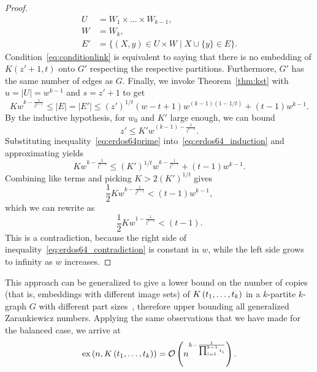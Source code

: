 \begin{theorem}
\begin{proof}
\begin{align*}
            U &= W_1 \times \dots \times W_{k-1}, \\
            W &= W_k, \\
            E' &= \{(X, y) \in U \times W \mid X \cup \{y\} \in E\}.
        \end{align*}
        Condition~\eqref{eq:conditionlink} is equivalent to saying that
        there is no embedding of $K(z' + 1, t)$ onto $G'$ respecting the respective partitions.
        Furthermore, $G'$ has the same number of edges as $G$.
        Finally, we invoke Theorem~\ref{thm:kst} with
        ${u = |U| = w^{k-1}}$ and
        ${s = z' + 1}$ to get
        \begin{equation} \label{eq:erdos64_induction}
            K w^{k - \frac{1}{t^{k-1}}} \leq
            |E| = |E'| \leq
            (z')^{1 / t}(w - t + 1)w^{(k-1)(1 - 1 / t)} + (t - 1)w^{k-1}.
        \end{equation}
        By the inductive hypothesis, for $w_0$ and $K'$ large enough, we can bound
        \begin{equation} \label{eq:erdos64prime}
            z' \leq K' w^{(k - 1) - \frac{1}{t^{k-2}}}.
        \end{equation}
        Substituting inequality~\eqref{eq:erdos64prime} into~\eqref{eq:erdos64_induction} and approximating yields
        \[
            K w^{k - \frac{1}{t^{k-1}}} \leq (K')^{1 / t} w^{k-\frac{1}{t^{k-1}}} + (t - 1)w^{k-1}.
        \]
        Combining like terms and picking $K > 2 (K')^{1 / t}$ gives
        \[
            \frac{1}{2}K w^{k - \frac{1}{t^{k-1}}} < (t - 1)w^{k-1},
        \]
        which we can rewrite as
        \begin{equation} \label{eq:erdos64_contradiction}
            \frac{1}{2}Kw^{1 - \frac{1}{t^{k-1}}} < (t - 1).
        \end{equation}
        This is a contradiction, because the right side of inequality~\eqref{eq:erdos64_contradiction}
        is constant in $w$, while the left side grows to infinity as $w$ increases.
    \end{proof}
\end{theorem}

This approach can be generalized to give a lower bound on the number of
copies (that is, embeddings with different image sets)
of $K\left(t_1, \dots, t_k\right)$ in a $k$-partite $k$-graph $G$
with different part sizes~\cite{carvajal2024canonical},
therefore upper bounding all generalized Zarankiewicz numbers.
Applying the same observations that we have made for the balanced case,
we arrive at
\begin{equation} \label{eq:general-partite-bound}
    \text{ex} \left( n, K\left(t_1, \dots, t_k\right) \right) = \mathcal{O}\left(n^{k - \frac{1}{\prod_{i=1}^{k-1} t_i}}\right).
\end{equation}

